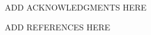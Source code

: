 \documentclass{cimento}
\begin{document}




\acknowledgments
ADD ACKNOWLEDGMENTS HERE

\begin{thebibliography}{0}
ADD REFERENCES HERE
\end{thebibliography}
\end{document}
